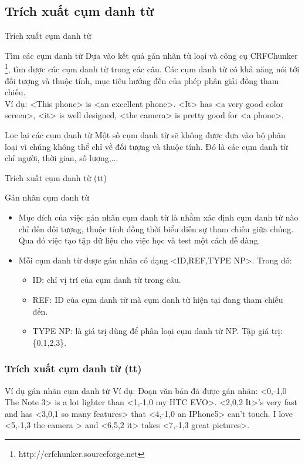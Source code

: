 \documentclass{beamer}
\begin{document}
	\subsection{Trích xuất cụm danh từ}
	\begin{frame}{Trích xuất cụm danh từ}		
		\begin{block}{Tìm các cụm danh từ}
			Dựa vào kết quả gán nhãn từ loại và công cụ CRFChunker \footnote{http://crfchunker.sourceforge.net}, tìm được các cụm danh từ trong các câu. Các cụm danh từ có khả năng nói tới đối tượng và thuộc tính, mục tiêu hướng đến của phép phân giải đồng tham chiếu.
			\\Ví dụ:
			<This phone> is <an excellent phone>.  <It> has <a very good color screen>, <it> is well designed, <the camera> is pretty good for <a phone>.
		\end{block}		
		\begin{block}{Lọc lại các cụm danh từ}
			Một số cụm danh từ sẽ không được đưa vào bộ phân loại vì chúng không thể chỉ về đối tượng và thuộc tính. Đó là các cụm danh từ chỉ người, thời gian, số lượng,...
		\end{block}
	\end{frame}	

	\begin{frame}{Trích xuất cụm danh từ (tt)}		
		\begin{block}{Gán nhãn cụm danh từ}
			\begin{itemize}
				\item{Mục đích của việc gán nhãn cụm danh từ là nhằm xác định cụm danh từ nào chỉ đến đối tượng, thuộc tính đồng thời biểu diễn sự tham chiếu giữa chúng. Qua đó việc tạo tập dữ liệu cho việc học và test một cách dễ dàng.}
				\item{Mỗi cụm danh từ được gán nhãn có dạng <ID,REF,TYPE NP>. Trong đó:
					\begin{itemize}
						\item{ID: chỉ vị trí của cụm danh từ trong câu.}
						\item{REF: ID của cụm danh từ mà cụm danh từ hiện tại đang tham chiếu đến.}
						\item{TYPE NP: là giá trị dùng để phân loại cụm danh từ NP. Tập giá trị: \{0,1,2,3\}.}			
					\end{itemize}}
			\end{itemize}
		\end{block}
	\end{frame}

	\begin{frame}
		\frametitle{Trích xuất cụm danh từ (tt)}
		\begin{block}{Ví dụ gán nhãn cụm danh từ}
			Ví dụ: Đoạn văn bản đã được gán nhãn:
			<0,-1,0 The Note 3> is a lot lighter than <1,-1,0 my HTC EVO>. <2,0,2 It>'s very fast and has <3,0,1 so many features> that <4,-1,0 an IPhone5> can't touch. I love <5,-1,3 the camera > and <6,5,2 it> takes <7,-1,3 great pictures>.
		\end{block}		
	\end{frame}
\end{document}
